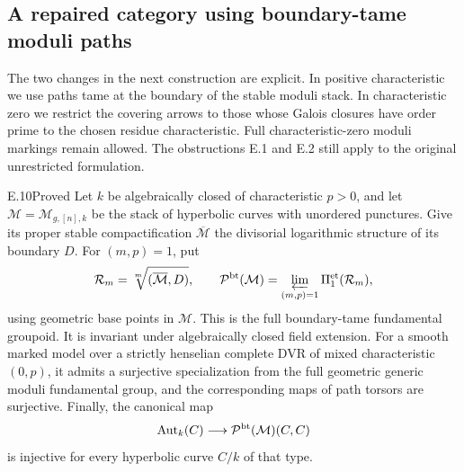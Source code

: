 \subsection{A repaired category using boundary-tame moduli paths}

The two changes in the next construction are explicit. In positive
characteristic we use paths tame at the boundary of the stable moduli
stack. In characteristic zero we restrict the covering arrows to those
whose Galois closures have order prime to the chosen residue
characteristic. Full characteristic-zero moduli markings remain allowed.
The obstructions E.1 and E.2 still apply to the original unrestricted
formulation.

\begin{claim}{E.10}{Proved}
Let $k$ be algebraically closed of characteristic $p>0$, and let
$\mathcal M=\mathcal M_{g,[n],k}$ be the stack of hyperbolic curves
with unordered punctures. Give its proper stable compactification
$\overline{\mathcal M}$ the divisorial logarithmic structure of its
boundary $D$. For $(m,p)=1$, put
\[
 \mathcal R_m=\sqrt[m]{(\overline{\mathcal M},D)},\qquad
 \mathcal P^{\mathrm{bt}}(\mathcal M)
   =\varprojlim_{(m,p)=1}\Pi_1^{\mathrm{et}}(\mathcal R_m),
\]
using geometric base points in $\mathcal M$. This is the full
boundary-tame fundamental groupoid. It is invariant under algebraically
closed field extension. For a smooth marked model over a strictly
henselian complete DVR of mixed characteristic $(0,p)$, it admits a
surjective specialization from the full geometric generic moduli
fundamental group, and the corresponding maps of path torsors are
surjective. Finally, the canonical map
\[
 \operatorname{Aut}_k(C)\longrightarrow
 \mathcal P^{\mathrm{bt}}(\mathcal M)(C,C)
\]
is injective for every hyperbolic curve $C/k$ of that type.
\end{claim}
